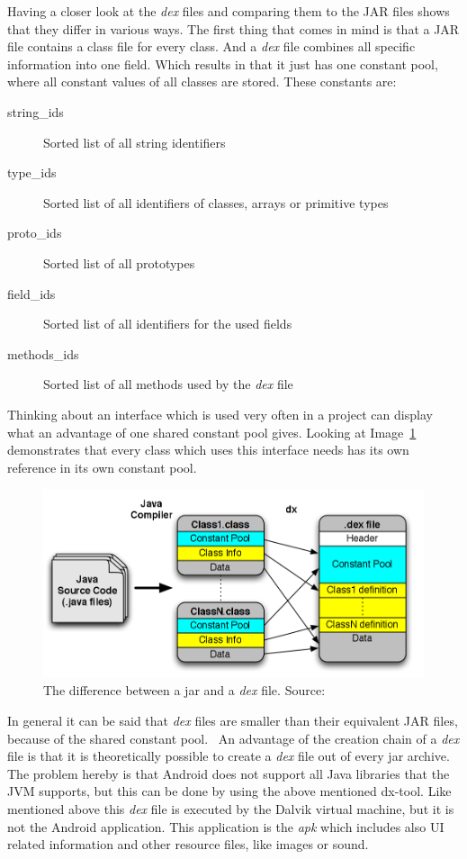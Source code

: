 Having a closer look at the \textit{dex} files and comparing them to the JAR files shows that they differ in various ways.
The first thing that comes in mind is that a JAR file contains a class file for every class.
And a \textit{dex} file combines all specific information into one field.
Which results in that it just has one constant pool, where all constant values of all classes are stored.
These constants are:
\begin{description}
  \item[string\_ids] Sorted list of all string identifiers
  \item[type\_ids] Sorted list of all identifiers of classes, arrays or primitive types
  \item[proto\_ids] Sorted list of all prototypes
  \item[field\_ids] Sorted list of all identifiers for the used fields
  \item[methods\_ids] Sorted list of all methods used by the \textit{dex} file
\end{description}
Thinking about an interface which is used very often in a project can display what an advantage of one shared constant pool gives.
Looking at Image~\ref{fig:jar-dex} demonstrates that every class which uses this interface needs has its own reference in its own constant pool.
\begin{figure}[h]
\begin{center}
\includegraphics[scale=0.41]{images/jar-dex.png} 
\caption{The difference between a jar and a \textit{dex} file. Source:~\cite{enck2011study}}
\label{fig:jar-dex}
\end{center}
\end{figure}

In general it can be said that \textit{dex} files are smaller than their equivalent JAR files, because of the shared constant pool.~\cite{bornstein2008dalvik}
An advantage of the creation chain of a \textit{dex} file is that it is theoretically possible to create a \textit{dex} file out of every jar archive.
The problem hereby is that Android does not support all Java libraries that the JVM supports, but this can be done by using the above mentioned dx-tool. 
Like mentioned above this \textit{dex} file is executed by the Dalvik virtual machine, but it is not the Android application.
This application is the \textit{apk}  which includes also UI related information and other resource files, like images or sound.


